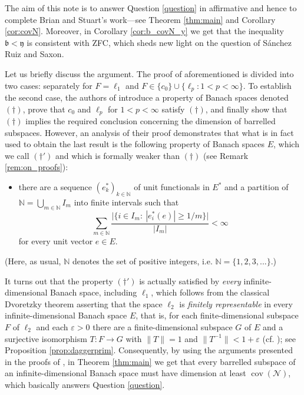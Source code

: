 \documentclass[a4paper,11pt,fleqn]{amsart}
\theoremstyle{definition}
\theoremstyle{remark}
\numberwithin{equation}{section}
\newcommand{\frakb}{\mathfrak{b}}
\newcommand{\fraky}{\mathfrak{y}}
\newcommand{\eps}{\varepsilon}
\newcommand{\N}{\mathbb{N}}
\newcommand{\nN}{\mathcal{N}}
\DeclareMathOperator{\cov}{cov}
\begin{document}
The aim of this note is to answer Question \ref{question} in affirmative and hence to complete Brian and Stuart's work---see Theorem \ref{thm:main} and Corollary \ref{cor:covN}. Moreover, in Corollary \ref{cor:b_covN_y} we get that the inequality $\frakb<\fraky$ is consistent with \textsf{ZFC}, which sheds new light on the question of  S\'anchez Ruiz and Saxon.

\medskip

Let us briefly discuss the argument. The proof of aforementioned \cite[Theorem 4.11]{BS24} is divided into two cases: separately for $F=\ell_1$ and $F\in\{c_0\}\cup\{\ell_p\colon 1<p<\infty\}$. To establish the second case, the authors of \cite{BS24} introduce a property of Banach spaces denoted $(\dagger)$, prove that $c_0$ and $\ell_p$ for $1<p<\infty$ satisfy $(\dagger)$, and finally show that $(\dagger)$ implies the required conclusion concerning the dimension of barrelled subspaces. However, an analysis of their proof demonstrates that what is in fact used to obtain the last result is the following property of Banach spaces $E$, which we call $(\dagger')$ and which is formally weaker than $(\dagger)$ (see Remark \ref{rem:on_proofs}):
\begin{itemize}[$(\dagger')$]
    \item there are a sequence $(e_k^*)_{k\in\N}$ of unit functionals in $E^*$ and a partition of $\N=\bigcup_{m\in\N}I_m$ into finite intervals such that
    $$\sum_{m\in\N}\frac{\big|\big\{i\in I_m\colon\ |e_i^*(e)|\ge1/m\big\}\big|}{|I_m|}<\infty$$
    for every unit vector $e\in E$.
\end{itemize}
(Here, as usual, $\N$ denotes the set of positive integers, i.e. $\N=\{1,2,3,...\}$.)%

It turns out that the property $(\dagger')$ is actually satisfied by \textit{every} infinite-dimensional Banach space, including $\ell_1$, which follows from the classical Dvoretzky theorem asserting that the space $\ell_2$ is \textit{finitely representable} in every infinite-dimensional Banach space $E$, that is, for each finite-dimensional subspace $F$ of $\ell_2$ and each $\eps>0$ there are a finite-dimensional subspace $G$ of $E$ and a surjective isomorphism $T\colon F\to G$ with $\|T\|=1$ and $\|T^{-1}\|<1+\eps$ (cf. \cite[Theorem 12.3.13 and Remark 12.1.3.(a)]{AK16}); see Proposition \ref{prop:daggerprim}. Consequently, by using the arguments presented in the proofs of \cite[Theorems 4.3 and 4.9]{BS24}, in Theorem \ref{thm:main} we get that every barrelled subspace of an infinite-dimensional Banach space must have dimension at least $\cov(\nN)$, which basically answers Question \ref{question}.
\end{document}
